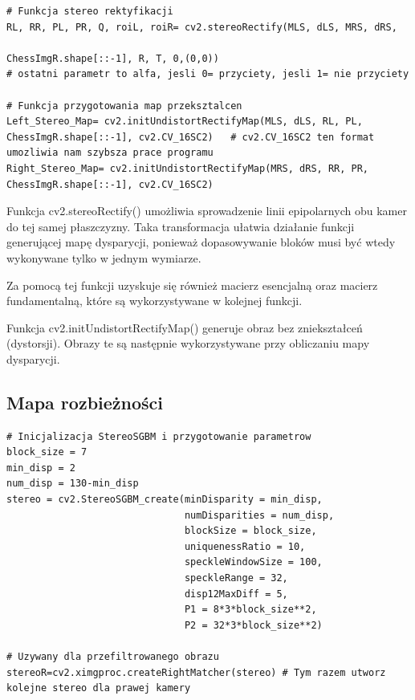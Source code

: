 \documentclass[magisterska]{pracadypl}
\begin{document}
\begin{lstlisting}[style=mypython]
# Funkcja stereo rektyfikacji
RL, RR, PL, PR, Q, roiL, roiR= cv2.stereoRectify(MLS, dLS, MRS, dRS, 
                                                 ChessImgR.shape[::-1], R, T, 0,(0,0))
# ostatni parametr to alfa, jesli 0= przyciety, jesli 1= nie przyciety

# Funkcja przygotowania map przeksztalcen
Left_Stereo_Map= cv2.initUndistortRectifyMap(MLS, dLS, RL, PL, ChessImgR.shape[::-1], cv2.CV_16SC2)   # cv2.CV_16SC2 ten format umozliwia nam szybsza prace programu
Right_Stereo_Map= cv2.initUndistortRectifyMap(MRS, dRS, RR, PR, ChessImgR.shape[::-1], cv2.CV_16SC2)
\end{lstlisting}

Funkcja cv2.stereoRectify() umożliwia sprowadzenie linii epipolarnych obu kamer do tej samej płaszczyzny. Taka transformacja ułatwia działanie funkcji generującej mapę dysparycji, ponieważ dopasowywanie bloków musi być wtedy wykonywane tylko w jednym wymiarze.

Za pomocą tej funkcji uzyskuje się również macierz esencjalną oraz macierz fundamentalną, które są wykorzystywane w kolejnej funkcji.

Funkcja cv2.initUndistortRectifyMap() generuje obraz bez zniekształceń (dystorsji). Obrazy te są następnie wykorzystywane przy obliczaniu mapy dysparycji.

\subsection{Mapa rozbieżności}

\begin{lstlisting}[style=mypython]
# Inicjalizacja StereoSGBM i przygotowanie parametrow
block_size = 7
min_disp = 2
num_disp = 130-min_disp
stereo = cv2.StereoSGBM_create(minDisparity = min_disp,
                               numDisparities = num_disp,
                               blockSize = block_size,
                               uniquenessRatio = 10,
                               speckleWindowSize = 100,
                               speckleRange = 32,
                               disp12MaxDiff = 5,
                               P1 = 8*3*block_size**2,
                               P2 = 32*3*block_size**2)

# Uzywany dla przefiltrowanego obrazu
stereoR=cv2.ximgproc.createRightMatcher(stereo) # Tym razem utworz kolejne stereo dla prawej kamery
\end{lstlisting}
\end{document}
